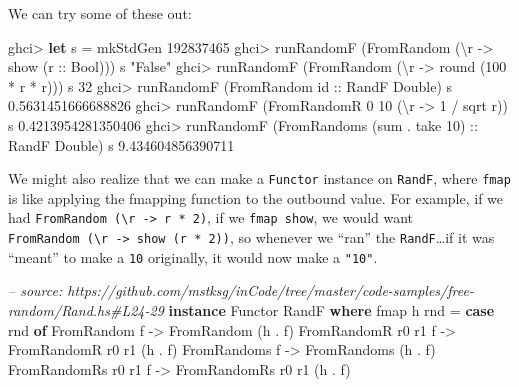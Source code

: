 \documentclass[]{article}
\newenvironment{Shaded}{}{}
\newcommand{\KeywordTok}[1]{\textcolor[rgb]{0.00,0.44,0.13}{\textbf{{#1}}}}
\newcommand{\DataTypeTok}[1]{\textcolor[rgb]{0.56,0.13,0.00}{{#1}}}
\newcommand{\DecValTok}[1]{\textcolor[rgb]{0.25,0.63,0.44}{{#1}}}
\newcommand{\FloatTok}[1]{\textcolor[rgb]{0.25,0.63,0.44}{{#1}}}
\newcommand{\StringTok}[1]{\textcolor[rgb]{0.25,0.44,0.63}{{#1}}}
\newcommand{\CommentTok}[1]{\textcolor[rgb]{0.38,0.63,0.69}{\textit{{#1}}}}
\newcommand{\OtherTok}[1]{\textcolor[rgb]{0.00,0.44,0.13}{{#1}}}
\newcommand{\FunctionTok}[1]{\textcolor[rgb]{0.02,0.16,0.49}{{#1}}}
\newcommand{\NormalTok}[1]{{#1}}
\begin{document}
We can try some of these out:

\begin{Shaded}
\begin{Highlighting}[]
\NormalTok{ghci}\FunctionTok{>} \KeywordTok{let} \NormalTok{s }\FunctionTok{=} \NormalTok{mkStdGen }\DecValTok{192837465}
\NormalTok{ghci}\FunctionTok{>} \NormalTok{runRandomF (}\DataTypeTok{FromRandom} \NormalTok{(\textbackslash{}r }\OtherTok{->} \NormalTok{show (}\OtherTok{r ::} \DataTypeTok{Bool}\NormalTok{))) s}
\StringTok{"False"}
\NormalTok{ghci}\FunctionTok{>} \NormalTok{runRandomF (}\DataTypeTok{FromRandom} \NormalTok{(\textbackslash{}r }\OtherTok{->} \NormalTok{round (}\DecValTok{100} \FunctionTok{*} \NormalTok{r }\FunctionTok{*} \NormalTok{r))) s}
\DecValTok{32}
\NormalTok{ghci}\FunctionTok{>} \NormalTok{runRandomF (}\DataTypeTok{FromRandom}\OtherTok{ id ::} \DataTypeTok{RandF} \DataTypeTok{Double}\NormalTok{) s}
\FloatTok{0.5631451666688826}
\NormalTok{ghci}\FunctionTok{>} \NormalTok{runRandomF (}\DataTypeTok{FromRandomR} \DecValTok{0} \DecValTok{10} \NormalTok{(\textbackslash{}r }\OtherTok{->} \DecValTok{1} \FunctionTok{/} \NormalTok{sqrt r)) s}
\FloatTok{0.4213954281350406}
\NormalTok{ghci}\FunctionTok{>} \NormalTok{runRandomF (}\DataTypeTok{FromRandoms} \NormalTok{(sum }\FunctionTok{.} \NormalTok{take }\DecValTok{10}\NormalTok{)}\OtherTok{ ::} \DataTypeTok{RandF} \DataTypeTok{Double}\NormalTok{) s}
\FloatTok{9.434604856390711}
\end{Highlighting}
\end{Shaded}

We might also realize that we can make a \texttt{Functor} instance on
\texttt{RandF}, where \texttt{fmap} is like applying the fmapping
function to the outbound value. For example, if we had
\texttt{FromRandom\ (\textbackslash{}r\ -\textgreater{}\ r\ *\ 2)}, if
we \texttt{fmap\ show}, we would want
\texttt{FromRandom\ (\textbackslash{}r\ -\textgreater{}\ show\ (r\ *\ 2))},
so whenever we ``ran'' the \texttt{RandF}\ldots{}if it was ``meant'' to
make a \texttt{10} originally, it would now make a \texttt{"10"}.

\begin{Shaded}
\begin{Highlighting}[]
\CommentTok{-- source: https://github.com/mstksg/inCode/tree/master/code-samples/free-random/Rand.hs#L24-29}
\KeywordTok{instance} \DataTypeTok{Functor} \DataTypeTok{RandF} \KeywordTok{where}
    \NormalTok{fmap h rnd }\FunctionTok{=} \KeywordTok{case} \NormalTok{rnd }\KeywordTok{of}
        \DataTypeTok{FromRandom}         \NormalTok{f }\OtherTok{->} \DataTypeTok{FromRandom}         \NormalTok{(h }\FunctionTok{.} \NormalTok{f)}
        \DataTypeTok{FromRandomR} \NormalTok{r0 r1  f }\OtherTok{->} \DataTypeTok{FromRandomR} \NormalTok{r0 r1  (h }\FunctionTok{.} \NormalTok{f)}
        \DataTypeTok{FromRandoms}        \NormalTok{f }\OtherTok{->} \DataTypeTok{FromRandoms}        \NormalTok{(h }\FunctionTok{.} \NormalTok{f)}
        \DataTypeTok{FromRandomRs} \NormalTok{r0 r1 f }\OtherTok{->} \DataTypeTok{FromRandomRs} \NormalTok{r0 r1 (h }\FunctionTok{.} \NormalTok{f)}
\end{Highlighting}
\end{Shaded}
\end{document}
